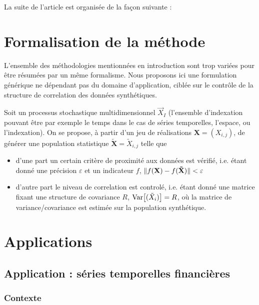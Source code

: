 La suite de l'article est organisée de la façon suivante : 


\section{Formalisation de la méthode}

L'ensemble des méthodologies mentionnées en introduction sont trop variées pour être résumées par un même formalisme. Nous proposons ici une formulation générique ne dépendant pas du domaine d'application, ciblée sur le contrôle de la structure de correlation des données synthétiques.

Soit un processus stochastique multidimensionnel $\vec{X}_I$ (l'ensemble d'indexation pouvant être par exemple le temps dans le cas de séries temporelles, l'espace, ou l'indexation). On se propose, à partir d'un jeu de réalisations $\mathbf{X}=(X_{i,j})$, de générer une population statistique $\mathbf{\tilde{X}}=\tilde{X}_{i,j}$ telle que
\begin{itemize}
\item d'une part un certain critère de proximité aux données est vérifié, i.e. étant donné une précision $\varepsilon$ et un indicateur $f$, $\| f(\mathbf{X})-f(\mathbf{\tilde{X}}) \| < \varepsilon$
\item d'autre part le niveau de correlation est controlé, i.e. étant donné une matrice fixant une structure de covariance $R$, $\operatorname{Var}\!\left[(\tilde{X}_i)\right] = R$, où la matrice de variance/covariance est estimée sur la population synthétique.
\end{itemize}


\section{Applications}



\subsection{Application : séries temporelles financières}


\subsubsection{Contexte}

